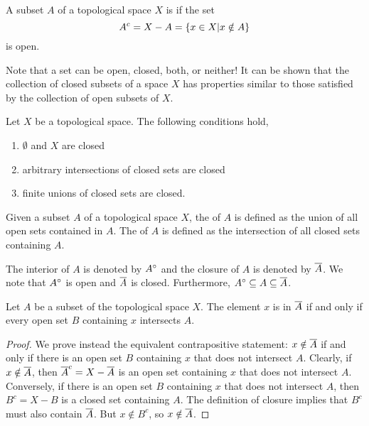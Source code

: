 \begin{definition}
A subset $A$ of a topological space $X$ is  if the set
\begin{equation*}
{A}^{c} = X - A = \{ x \in X | x \notin A \}
\end{equation*}
is open.
\end{definition}

Note that a set can be open, closed, both, or neither!
It can be shown that the collection of closed subsets of a space $X$ has properties similar to those satisfied by the collection of open subsets of $X$.

\begin{fact}
Let $X$ be a topological space.
The following conditions hold,
\begin{enumerate}
\item $\emptyset$ and $X$ are closed
\item arbitrary intersections of closed sets are closed
\item finite unions of closed sets are closed.
\end{enumerate}
\end{fact}

\begin{definition}
Given a subset $A$ of a topological space $X$, the  of $A$ is defined as the union of all open sets contained in $A$.
The  of $A$ is defined as the intersection of all closed sets containing $A$.
\end{definition}

The interior of $A$ is denoted by ${A}^{\circ}$ and the closure of $A$ is denoted by $\overline{A}$.
We note that ${A}^{\circ}$ is open and $\overline{A}$ is closed.
Furthermore, ${A}^{\circ} \subseteq A \subseteq \overline{A}$.

\begin{theorem} \label{theorem:ClosureConditions}
Let $A$ be a subset of the topological space $X$.
The element $x$ is in $\overline{A}$ if and only if every open set $B$ containing $x$ intersects $A$.
\end{theorem}
\begin{proof}
We prove instead the equivalent contrapositive statement: $x \notin \overline{A}$ if and only if there is an open set $B$ containing $x$ that does not intersect $A$.
Clearly, if  $x \notin \overline{A}$, then $\overline{A}^c = X - \overline{A}$ is an open set containing $x$ that does not intersect $A$.
Conversely, if there is an open set $B$ containing $x$ that does not intersect $A$, then $B^c = X-B$ is a closed set containing $A$.
The definition of closure implies that $B^c$ must also contain $\overline{A}$.
But $x \notin B^c$, so $x\notin \overline{A}$.
\end{proof}

